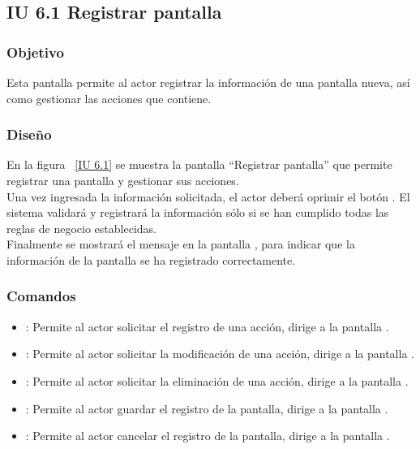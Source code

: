 \newpage 
\subsection{IU 6.1 Registrar pantalla}

\subsubsection{Objetivo}
	
	Esta pantalla permite al actor registrar la información de una pantalla nueva, así como gestionar las acciones que contiene.

\subsubsection{Diseño}

    En la figura ~\ref{IU 6.1} se muestra la pantalla ``Registrar pantalla'' que permite registrar una pantalla y gestionar sus acciones. \\
    
    Una vez ingresada la información solicitada, el actor deberá oprimir el botón . El sistema validará y registrará la 
    información sólo si se han cumplido todas las reglas de negocio establecidas.  \\
    
    Finalmente se mostrará el mensaje  en la pantalla , 
    para indicar que la información de la pantalla
    se ha registrado correctamente.        



\subsubsection{Comandos}
\begin{itemize}
	\item {}: Permite al actor solicitar el registro de una acción, dirige a la pantalla .
	\item \btnEditar[Modificar]: Permite al actor solicitar la modificación de una acción, dirige a la pantalla .
	\item \btnEliminar[Eliminar]: Permite al actor solicitar la eliminación de una acción, dirige a la pantalla .
	\item {}: Permite al actor guardar el registro de la pantalla, dirige a la pantalla .
	\item {}: Permite al actor cancelar el registro de la pantalla, dirige a la pantalla .
\end{itemize}

